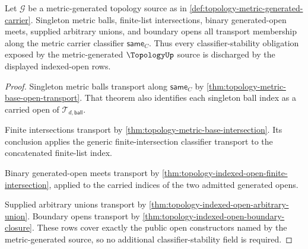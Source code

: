 \begin{theorem}
\label{thm:topology-metric-generated-classifier-scope}
Let $\mathcal{G}$ be a metric-generated topology source as in \autoref{def:topology-metric-generated-carrier}. Singleton metric balls, finite-list intersections, binary generated-open meets, supplied arbitrary unions, and boundary opens all transport membership along the metric carrier classifier $\mathsf{same}_C$. Thus every classifier-stability obligation exposed by the metric-generated $\TopologyUp$ source is discharged by the displayed indexed-open rows.
\end{theorem}
\begin{proof}
Singleton metric balls transport along $\mathsf{same}_C$ by \autoref{thm:topology-metric-base-open-transport}. That theorem also identifies each singleton ball index as a carried open of $\mathcal{T}_{d,\mathsf{ball}}$.

Finite intersections transport by \autoref{thm:topology-metric-base-intersection}. Its conclusion applies the generic finite-intersection classifier transport to the concatenated finite-list index.

Binary generated-open meets transport by \autoref{thm:topology-indexed-open-finite-intersection}, applied to the carried indices of the two admitted generated opens.

Supplied arbitrary unions transport by \autoref{thm:topology-indexed-open-arbitrary-union}. Boundary opens transport by \autoref{thm:topology-indexed-open-boundary-closure}. These rows cover exactly the public open constructors named by the metric-generated source, so no additional classifier-stability field is required.
\end{proof}


